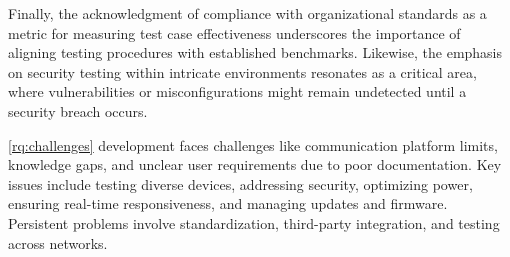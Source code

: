 \label{find:results9}

Finally, the acknowledgment of compliance with organizational standards as a metric for measuring test case effectiveness underscores the importance of aligning testing procedures with established benchmarks. Likewise, the emphasis on security testing within intricate \iot environments resonates as a critical area, where vulnerabilities or misconfigurations might remain undetected until a security breach occurs. 

\label{find:results10}




\begin{boxK}
\ref{rq:challenges} \iot development faces challenges like communication platform limits, knowledge gaps, and unclear user requirements due to poor documentation. Key issues include testing diverse devices, addressing security, optimizing power, ensuring real-time responsiveness, and managing updates and firmware. Persistent problems involve standardization, third-party integration, and testing across networks.

\end{boxK}
